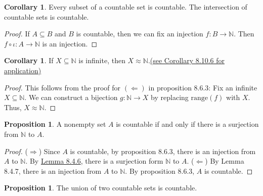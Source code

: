 \documentclass[14pt]{article}
\theoremstyle{definition}
\newtheorem{proposition}[definition]{Proposition}
\newtheorem{coro}[definition]{Corollary}
\newcommand{\fun}[3]{#1\colon #2\rightarrow#3}
\newcommand{\bb}[1]{\mathbb{#1}}
\begin{document}
\vspace{2mm}

\begin{coro}
    Every subset of a countable set is countable. The intersection of countable sets is countable.
\end{coro}

\begin{proof}
    If $A\subseteq B$ and $B$ is countable, then we can fix an injection $\fun{f}{B}{\bb{N}}$.
    Then $f\circ \iota \colon A\rightarrow \bb{N}$ is an injection.
\end{proof}

\vspace{2mm}

\hypertarget{Corollary 8.6.5}{\begin{coro}
    If $X\subseteq \bb{N}$ is infinite, then $X\approx \bb{N}$.\hyperlink{Corollary 8.10.6}{(see Corollary 8.10.6 for application)}
    \end{coro}} 
\begin{proof}
This follows from the proof for $(\Leftarrow)$ in proposition 8.6.3: Fix an infinite $ X\subseteq \bb{N}$. We can construct a bijection $\fun{g}{\bb{N}}{X}$
by replacing $\mathrm{range}(f)$ with $X$. Thus, $X\approx \bb{N}$.
\end{proof}

\vspace{2mm}


\begin{proposition}
    A nonempty set $A$ is countable if and only if there is a surjection from $\bb{N}$ to $A$. 
\end{proposition}
\begin{proof}
    ($\Rightarrow$) Since $A$  is countable, by proposition 8.6.3, there is an injection from $A$ to 
    $\bb{N}$. By \hyperlink{Lemma 8.4.6}{Lemma 8.4.6},  there is a surjection form $\bb{N}$ to $A$. ($\Leftarrow$) By Lemma 8.4.7, there is an injection from $A$ to $\bb{N}$. By 
    proposition 8.6.3, $A$ is countable.
\end{proof}

\vspace{2mm}

\begin{proposition}
    The union of two countable sets is countable. 
\end{proposition}
\end{document}
